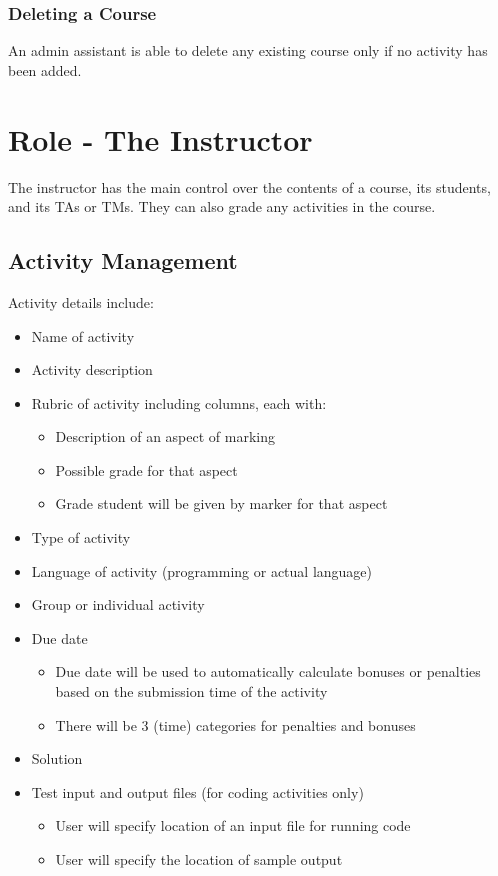 \documentclass{article}
\begin{document}
\subsubsection{Deleting a Course}
An admin assistant is able to delete any existing course only if no activity has been added.

\section{Role - The Instructor \label{Instructor}}
The instructor has the main control over the contents of a course, its students, 
and its TAs or TMs. They can also grade any activities in the course.

\subsection{Activity Management \label{ActivityManagement}}
Activity details include:
\begin {itemize}
	\item Name of activity
	\item Activity description
	\item Rubric of activity including columns, each with:
	\begin{itemize}
		\item Description of an aspect of marking
		\item Possible grade for that aspect 
		\item Grade student will be given by marker for that aspect
	\end{itemize}
	\item Type of activity
	\item Language of activity (programming or actual language)
	\item Group or individual activity
	\item Due date 
	\begin{itemize}
		\item Due date will be used to automatically calculate bonuses or 
			penalties based on the submission time of the activity
		\item There will be 3 (time) categories for penalties and bonuses
	\end{itemize}
	\item Solution
	\item Test input and output files (for coding activities only)
	\begin{itemize}
		\item User will specify location of an input file for running code
		\item User will specify the location of sample output
	\end{itemize}
\end {itemize}
\end{document}
